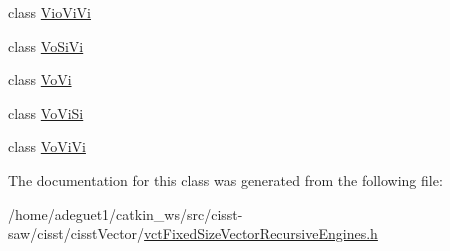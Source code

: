 \begin{DoxyCompactItemize}
\item 
class \hyperlink{classvct_fixed_size_vector_recursive_engines_3_010_01_4_1_1_vio_vi_vi}{Vio\-Vi\-Vi}
\item 
class \hyperlink{classvct_fixed_size_vector_recursive_engines_3_010_01_4_1_1_vo_si_vi}{Vo\-Si\-Vi}
\item 
class \hyperlink{classvct_fixed_size_vector_recursive_engines_3_010_01_4_1_1_vo_vi}{Vo\-Vi}
\item 
class \hyperlink{classvct_fixed_size_vector_recursive_engines_3_010_01_4_1_1_vo_vi_si}{Vo\-Vi\-Si}
\item 
class \hyperlink{classvct_fixed_size_vector_recursive_engines_3_010_01_4_1_1_vo_vi_vi}{Vo\-Vi\-Vi}
\end{DoxyCompactItemize}


The documentation for this class was generated from the following file\-:\begin{DoxyCompactItemize}
\item 
/home/adeguet1/catkin\-\_\-ws/src/cisst-\/saw/cisst/cisst\-Vector/\hyperlink{vct_fixed_size_vector_recursive_engines_8h}{vct\-Fixed\-Size\-Vector\-Recursive\-Engines.\-h}\end{DoxyCompactItemize}

